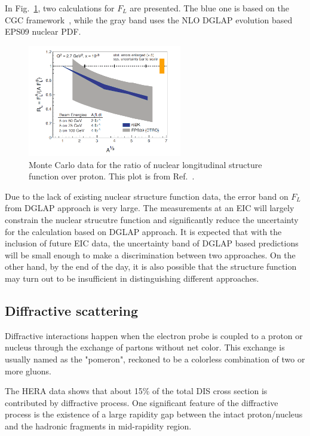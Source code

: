 In Fig.~\ref{fig:F_L},
two calculations for $F_L$ are presented. The blue one is based on the CGC framework~\cite{Albacete:2009fh},
while the gray band uses the NLO DGLAP evolution based EPS09 nuclear PDF. 
\begin{figure}
\centering
\includegraphics[width=0.6\textwidth]{plots/chpt3/FL_WP.png}
\caption[Longitudinal structure function ratio]{
Monte Carlo data for the ratio of nuclear longitudinal structure function over proton. This plot is from Ref.~\cite{Accardi:2012qut}.}
\label{fig:F_L}
\end{figure}
Due to the lack of existing nuclear structure function data, the error band on $F_L$ from 
DGLAP approach is very large. The measurements at an EIC will largely constrain the nuclear strucutre
function and significantly reduce the uncertainty for the calculation based on DGLAP approach.
It is expected that with the inclusion of future EIC data, the uncertainty band of DGLAP based
predictions will be small enough to make a discrimination between two approaches.
On the other hand, by the end of the day, it is also possible that the structure function may turn out to be insufficient 
in distinguishing different approaches.


\subsection{Diffractive scattering}
Diffractive interactions happen when the electron probe is coupled to a proton
or nucleus through the exchange of partons without net color. This exchange is
usually named as the "pomeron", reckoned to be a colorless combination of two or
more gluons.

The HERA data shows that about 15\% of the total DIS cross section is
contributed by diffractive process. One significant feature of the diffractive
process is the existence of a large rapidity gap between the intact
proton/nucleus and the hadronic fragments in mid-rapidity region.

